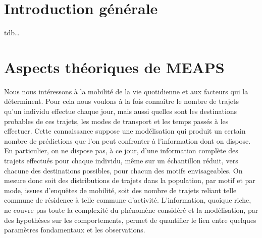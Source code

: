\documentclass[
  10pt,
  a4paper,
  numbers=noendperiod,
  DIV=9]{scrreprt}
\begin{document}

\hypertarget{introduction-guxe9nuxe9rale}{%
\chapter*{Introduction générale}\label{introduction-guxe9nuxe9rale}}


tdb\ldots{}


\hypertarget{aspects-thuxe9oriques-de-meaps}{%
\chapter{Aspects théoriques de
MEAPS}\label{aspects-thuxe9oriques-de-meaps}}

Nous nous intéressons à la mobilité de la vie quotidienne et aux
facteurs qui la déterminent. Pour cela nous voulons à la fois connaître
le nombre de trajets qu'un individu effectue chaque jour, mais aussi
quelles sont les destinations probables de ces trajets, les modes de
transport et les temps passés à les effectuer. Cette connaissance
suppose une modélisation qui produit un certain nombre de prédictions
que l'on peut confronter à l'information dont on dispose. En
particulier, on ne dispose pas, à ce jour, d'une information complète
des trajets effectués pour chaque individu, même sur un échantillon
réduit, vers chacune des destinations possibles, pour chacun des motifs
envisageables. On mesure donc soit des distributions de trajets dans la
population, par motif et par mode, issues d'enquêtes de mobilité, soit
des nombre de trajets reliant telle commune de résidence à telle commune
d'activité. L'information, quoique riche, ne couvre pas toute la
complexité du phénomène considéré et la modélisation, par des hypothèses
sur les comportements, permet de quantifier le lien entre quelques
paramètres fondamentaux et les observations.
\end{document}
